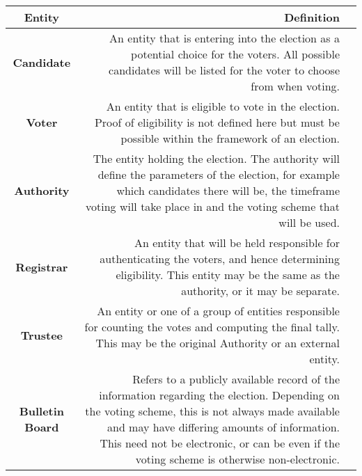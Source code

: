 \begin{table}[H]
    \centering
    \begin{tabular}{Sr S{p{0.666\textwidth}}}
        \hline
        \textbf{Entity}         & \textbf{Definition}                                                                                                                                                                                                                                                                             \\
        \hline\hline
        \textbf{Candidate}      & An entity that is entering into the election as a potential choice for the voters. All possible candidates will be listed for the voter to choose from when voting.                                                                                                                             \\
        \hline
        \textbf{Voter}          & An entity that is eligible to vote in the election. Proof of eligibility is not defined here but must be possible within the framework of an election.                                                                                                                                          \\
        \hline
        \textbf{Authority}      & The entity holding the election. The authority will define the parameters of the election, for example which candidates there will be, the timeframe voting will take place in and the voting scheme that will be used.                                                                         \\
        \hline
        \textbf{Registrar}      & An entity that will be held responsible for authenticating the voters, and hence determining eligibility. This entity may be the same as the authority, or it may be separate.                                                                                                                  \\
        \hline
        \textbf{Trustee}        & An entity or one of a group of entities responsible for counting the votes and computing the final tally. This may be the original Authority or an external entity.                                                                                                                             \\

        \hline
        \textbf{Bulletin Board} & Refers to a publicly available record of the information regarding the election. Depending on the voting scheme, this is not always made available and may have differing amounts of information. This need not be electronic, or can be even if the voting scheme is otherwise non-electronic. \\


\end{tabular}
\end{table}
